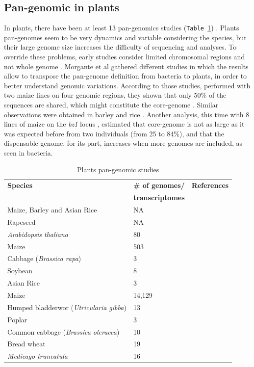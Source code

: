 \documentclass[a4paper,10pt,twoside]{report}
\begin{document}
\subsection{Pan-genomic in plants}
In plants, there have been at least 13 pan-genomics studies (\texttt{Table~\ref{panGplants}}) \cite{Golicz2016a}. Plants pan-genomes seem to be very dynamics and variable considering the species, but their large genome size increases the difficulty of sequencing and analyses. To override these problems, early studies consider limited chromosomal regions and not whole genome \cite{WangDooner2006}. Morgante et al \cite{Morgante2007} gathered different studies in which the results allow to transpose the pan-genome definition from bacteria to plants, in order to better understand genomic variations. According to those studies, performed with two maize lines on four genomic regions, they shown that only 50\% of the sequences are shared, which might constitute the core-genome \cite{Morgante2007}. Similar observations were obtained in barley and rice \cite{Morgante2007}. Another analysis, this time with 8 lines of maize on the \textit{bz1} locus \cite{WangDooner2006}, estimated that core-genome is not as large as it was expected before from two individuals (from 25 to 84\%), and that the dispensable genome, for its part, increases when more genomes are included, as seen in bacteria.\\

\begin{table}
\centering
\begin{tabular}{lll}
 \textbf{Species} & \textbf{\# of genomes/} & \textbf{References} \\
		  &  \textbf{transcriptomes} & \\
Maize, Barley and Asian Rice & NA & \cite{Morgante2007} \\
Rapeseed & NA & \cite{Cheung2009}\\
\textit{Arabidopsis thaliana} & 80 & \cite{Cao2011}\\
Maize & 503 & \cite{Hirsch2014}\\
Cabbage (\textit{Brassica rapa}) & 3 & \cite{Lin2014a}\\
Soybean & 8 & \cite{Li2014b}\\
Asian Rice & 3 & \cite{Schatz2014}\\
Maize & 14,129 & \cite{Lu2015}\\
Humped bladderwor (\textit{Utricularia gibba}) & 13 & \cite{Alcaraz2016}\\
Poplar & 3 & \cite{Pinosio2016}\\
Common cabbage (\textit{Brassica oleracea}) & 10 & \cite{Golicz2016a}\\
Bread wheat & 19 & \cite{Montenegro2017}\\
\textit{Medicago truncatula} & 16 & \cite{Zhou2017} \\
\end{tabular}
\caption{Plants pan-genomic studies}
\label{panGplants}
\end{table}
\end{document}
